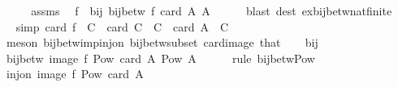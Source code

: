 \begin{isabellebody}
\ {\isacharminus}{\kern0pt}\isanewline
\ \ \isamarkupfalse%
\ assms\ \isamarkupfalse%
\ f\ \ bij{\isacharcolon}{\kern0pt}\ {\isachardoublequoteopen}bij{\isacharunderscore}{\kern0pt}betw\ f\ {\isacharbraceleft}{\kern0pt}{}{\isachardot}{\kern0pt}{\isachardot}{\kern0pt}{\isacharless}{\kern0pt}card\ A{\isacharbraceright}{\kern0pt}\ A{\isachardoublequoteclose}\isanewline
\ \ \ \ \isamarkupfalse%
\ {\isacharparenleft}{\kern0pt}blast\ dest{\isacharcolon}{\kern0pt}\ ex{\isacharunderscore}{\kern0pt}bij{\isacharunderscore}{\kern0pt}betw{\isacharunderscore}{\kern0pt}nat{\isacharunderscore}{\kern0pt}finite{\isacharparenright}{\kern0pt}\isanewline
\ \ \isamarkupfalse%
\ \isamarkupfalse%
\ {\isacharbrackleft}{\kern0pt}simp{\isacharbrackright}{\kern0pt}{\isacharcolon}{\kern0pt}\ {\isachardoublequoteopen}card\ {\isacharparenleft}{\kern0pt}f\ {\isacharbackquote}{\kern0pt}\ C{\isacharparenright}{\kern0pt}\ {\isacharequal}{\kern0pt}\ card\ C{\isachardoublequoteclose}\ \ {\isachardoublequoteopen}C\ {\isasymsubseteq}\ {\isacharbraceleft}{\kern0pt}{}{\isachardot}{\kern0pt}{\isachardot}{\kern0pt}{\isacharless}{\kern0pt}card\ A{\isacharbraceright}{\kern0pt}{\isachardoublequoteclose}\ \ C\isanewline
\ \ \ \ \isamarkupfalse%
\ {\isacharparenleft}{\kern0pt}meson\ bij{\isacharunderscore}{\kern0pt}betw{\isacharunderscore}{\kern0pt}imp{\isacharunderscore}{\kern0pt}inj{\isacharunderscore}{\kern0pt}on\ bij{\isacharunderscore}{\kern0pt}betw{\isacharunderscore}{\kern0pt}subset\ card{\isacharunderscore}{\kern0pt}image\ that{\isacharparenright}{\kern0pt}\isanewline
\ \ \isamarkupfalse%
\ bij\ \isamarkupfalse%
\ {\isachardoublequoteopen}bij{\isacharunderscore}{\kern0pt}betw\ {\isacharparenleft}{\kern0pt}image\ f{\isacharparenright}{\kern0pt}\ {\isacharparenleft}{\kern0pt}Pow\ {\isacharbraceleft}{\kern0pt}{}{\isachardot}{\kern0pt}{\isachardot}{\kern0pt}{\isacharless}{\kern0pt}card\ A{\isacharbraceright}{\kern0pt}{\isacharparenright}{\kern0pt}\ {\isacharparenleft}{\kern0pt}Pow\ A{\isacharparenright}{\kern0pt}{\isachardoublequoteclose}\isanewline
\ \ \ \ \isamarkupfalse%
\ {\isacharparenleft}{\kern0pt}rule\ bij{\isacharunderscore}{\kern0pt}betw{\isacharunderscore}{\kern0pt}Pow{\isacharparenright}{\kern0pt}\isanewline
\ \ \isamarkupfalse%
\ \isamarkupfalse%
\ {\isachardoublequoteopen}inj{\isacharunderscore}{\kern0pt}on\ {\isacharparenleft}{\kern0pt}image\ f{\isacharparenright}{\kern0pt}\ {\isacharparenleft}{\kern0pt}Pow\ {\isacharbraceleft}{\kern0pt}{}{\isachardot}{\kern0pt}{\isachardot}{\kern0pt}{\isacharless}{\kern0pt}card\ A{\isacharbraceright}{\kern0pt}{\isacharparenright}{\kern0pt}{\isachardoublequoteclose}\isanewline

\end{isabellebody}
